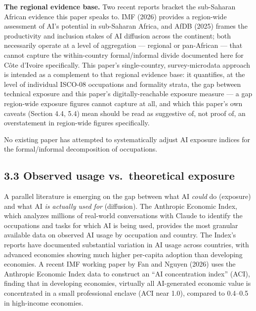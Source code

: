 \documentclass[
  11pt,
]{article}
\begin{document}
\textbf{The regional evidence base.} Two recent reports bracket the
sub-Saharan African evidence this paper speaks to. IMF (2026) provides a
region-wide assessment of AI's potential in sub-Saharan Africa, and AfDB
(2025) frames the productivity and inclusion stakes of AI diffusion
across the continent; both necessarily operate at a level of aggregation
--- regional or pan-African --- that cannot capture the within-country
formal/informal divide documented here for Côte d'Ivoire specifically.
This paper's single-country, survey-microdata approach is intended as a
complement to that regional evidence base: it quantifies, at the level
of individual ISCO-08 occupations and formality strata, the gap between
technical exposure and this paper's digitally-reachable exposure measure
--- a gap region-wide exposure figures cannot capture at all, and which
this paper's own caveats (Section 4.4, 5.4) mean should be read as
suggestive of, not proof of, an overstatement in region-wide figures
specifically.

No existing paper has attempted to systematically adjust AI exposure
indices for the formal/informal decomposition of occupations.

\subsection{3.3 Observed usage vs.~theoretical
exposure}\label{observed-usage-vs.-theoretical-exposure}

A parallel literature is emerging on the gap between what AI
\emph{could} do (exposure) and what AI \emph{is actually used for}
(diffusion). The Anthropic Economic Index, which analyzes millions of
real-world conversations with Claude to identify the occupations and
tasks for which AI is being used, provides the most granular available
data on observed AI usage by occupation and country. The Index's reports
have documented substantial variation in AI usage across countries, with
advanced economies showing much higher per-capita adoption than
developing economies. A recent IMF working paper by Fan and Nguyen
(2026) uses the Anthropic Economic Index data to construct an ``AI
concentration index'' (ACI), finding that in developing economies,
virtually all AI-generated economic value is concentrated in a small
professional enclave (ACI near 1.0), compared to 0.4--0.5 in high-income
economies.
\end{document}
